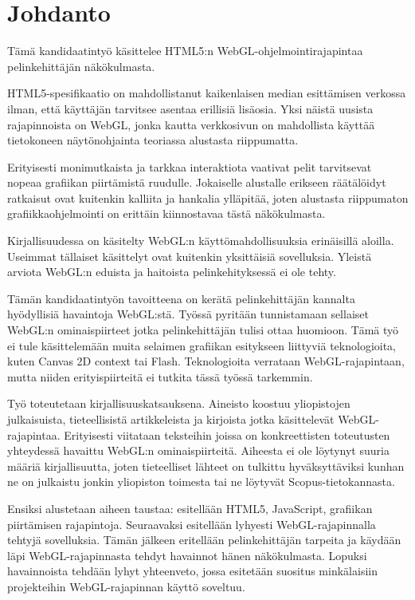 \section{Johdanto}
\label{sec:johdanto}

Tämä kandidaatintyö käsittelee HTML5:n WebGL-ohjelmointirajapintaa pelinkehittäjän näkökulmasta. 

HTML5-spesifikaatio on mahdollistanut kaikenlaisen median esittämisen verkossa ilman, että käyttäjän tarvitsee asentaa erillisiä lisäosia. Yksi näistä uusista rajapinnoista on WebGL, jonka kautta verkkosivun on mahdollista käyttää tietokoneen näytönohjainta teoriassa alustasta riippumatta.

Erityisesti monimutkaista ja tarkkaa interaktiota vaativat pelit tarvitsevat nopeaa grafiikan piirtämistä ruudulle. Jokaiselle alustalle erikseen räätälöidyt ratkaisut ovat kuitenkin kalliita ja hankalia ylläpitää, joten alustasta riippumaton grafiikkaohjelmointi on erittäin kiinnostavaa tästä näkökulmasta. 

Kirjallisuudessa on käsitelty WebGL:n käyttömahdollisuuksia erinäisillä aloilla. Useimmat tällaiset käsittelyt ovat kuitenkin yksittäisiä sovelluksia. Yleistä arviota WebGL:n eduista ja haitoista pelinkehityksessä ei ole tehty. 

Tämän kandidaatintyön tavoitteena on kerätä pelinkehittäjän kannalta hyödyllisiä havaintoja WebGL:stä. Työssä pyritään tunnistamaan sellaiset WebGL:n ominaispiirteet jotka  pelinkehittäjän tulisi ottaa huomioon.
Tämä työ ei tule käsittelemään muita selaimen grafiikan esitykseen liittyviä teknologioita, kuten Canvas 2D context tai Flash. Teknologioita verrataan WebGL-rajapintaan, mutta niiden erityispiirteitä ei tutkita tässä työssä tarkemmin.

Työ toteutetaan kirjallisuuskatsauksena. Aineisto koostuu yliopistojen julkaisuista, tieteellisistä artikkeleista ja kirjoista jotka käsittelevät WebGL-rajapintaa. Erityisesti viitataan teksteihin joissa on konkreettisten toteutusten yhteydessä havaittu WebGL:n ominaispiirteitä. Aiheesta ei ole löytynyt suuria määriä kirjallisuutta, joten tieteelliset lähteet on tulkittu hyväksyttäviksi kunhan ne on julkaistu jonkin yliopiston toimesta tai ne löytyvät Scopus-tietokannasta.

Ensiksi alustetaan aiheen taustaa: esitellään HTML5, JavaScript, grafiikan piirtämisen rajapintoja. Seuraavaksi esitellään lyhyesti WebGL-rajapinnalla tehtyjä sovelluksia. Tämän jälkeen eritellään pelinkehittäjän tarpeita ja käydään läpi WebGL-rajapinnasta tehdyt havainnot hänen näkökulmasta. Lopuksi havainnoista tehdään lyhyt yhteenveto, jossa esitetään suositus minkälaisiin projekteihin WebGL-rajapinnan käyttö soveltuu.